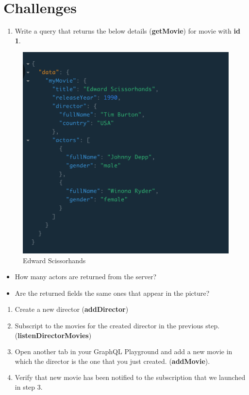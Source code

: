\documentclass[]{book}
\providecommand{\tightlist}{%
  \setlength{\itemsep}{0pt}\setlength{\parskip}{0pt}}
\begin{document}
\section{Challenges}\label{challenges}

\begin{enumerate}
\def\labelenumi{\arabic{enumi}.}
\tightlist
\item
  Write a query that returns the below details (\textbf{getMovie}) for
  movie with \textbf{id 1}.
\end{enumerate}

\begin{figure}
\centering
\includegraphics{assets/challenge-one.png}
\caption{Edward Scissorhands}
\end{figure}

\begin{itemize}
\item
  How many actors are returned from the server?
\item
  Are the returned fields the same ones that appear in the picture?
\end{itemize}

\begin{enumerate}
\def\labelenumi{\arabic{enumi}.}
\setcounter{enumi}{1}
\tightlist
\item
  Create a new director (\textbf{addDirector})
\item
  Subscript to the movies for the created director in the previous step.
  (\textbf{listenDirectorMovies})
\item
  Open another tab in your GraphQL Playground and add a new movie in
  which the director is the one that you just created.
  (\textbf{addMovie}).
\item
  Verify that new movie has been notified to the subscription that we
  launched in step 3.
\end{enumerate}
\end{document}
